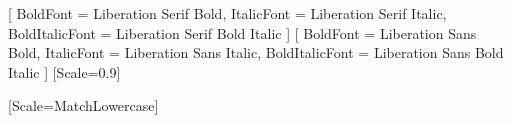 

\usepackage{fontspec}
\usepackage{polyglossia}
\setmainlanguage{vietnamese}

\setmainfont{Liberation Serif}[
    BoldFont = Liberation Serif Bold,
    ItalicFont = Liberation Serif Italic,
    BoldItalicFont = Liberation Serif Bold Italic
]
\setsansfont{Liberation Sans}[
    BoldFont = Liberation Sans Bold,
    ItalicFont = Liberation Sans Italic,
    BoldItalicFont = Liberation Sans Bold Italic
]
\setmonofont{Liberation Mono}[Scale=0.9]

[Scale=MatchLowercase]

\usepackage{unicode-math}

\usepackage[protrusion=true, expansion=false]{microtype}


\usepackage{xcolor}
\usepackage{minted} %
\usepackage{graphicx}
\graphicspath{{figures/}{chapters/ch2_background/}{chapters/ch3_methodology/}}
\usepackage{calc}
\usepackage{url}
\usepackage{amsmath}
\usepackage{caption}
\usepackage{subcaption}
\captionsetup{justification=centering, labelfont=bf}
\captionsetup[subfigure]{justification=centering}



\usepackage[backend=biber,style=ieee]{biblatex}


